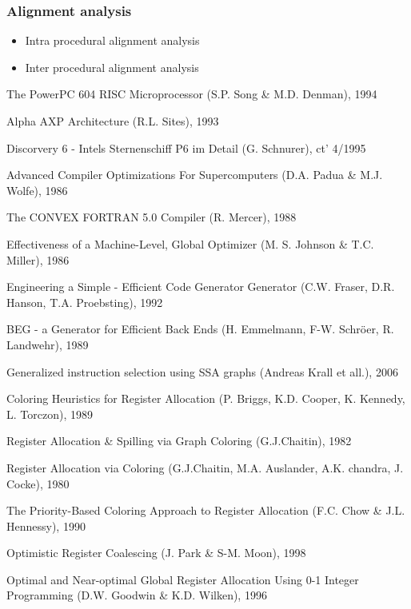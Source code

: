 \documentclass[a4paper,10pt]{article}
\begin{document}
\subsubsection{Alignment analysis}
\begin{itemize}
 \item Intra procedural alignment analysis
 \item Inter procedural alignment analysis
\end{itemize}

\begin{thebibliography}{9}
\footnotesize
{}
The PowerPC 604 RISC Microprocessor (S.P. Song \& M.D. Denman), 1994

Alpha AXP Architecture (R.L. Sites), 1993

Discorvery 6 - Intels Sternenschiff P6 im Detail (G. Schnurer), ct' 4/1995

Advanced Compiler Optimizations For Supercomputers (D.A. Padua \& M.J. Wolfe), 1986

The CONVEX FORTRAN 5.0 Compiler (R. Mercer), 1988

Effectiveness of a Machine-Level, Global Optimizer (M. S. Johnson \& T.C. Miller), 1986

Engineering a Simple - Efficient Code Generator Generator (C.W. Fraser, D.R. Hanson, T.A. Proebsting), 1992

BEG - a Generator for Efficient Back Ends (H. Emmelmann, F-W. Schr\"oer, R. Landwehr), 1989

Generalized instruction selection using SSA graphs (Andreas Krall et all.), 2006

Coloring Heuristics for Register Allocation (P. Briggs, K.D. Cooper, K. Kennedy, L. Torczon), 1989

Register Allocation \& Spilling via Graph Coloring (G.J.Chaitin), 1982

Register Allocation via Coloring (G.J.Chaitin, M.A. Auslander, A.K. chandra, J. Cocke), 1980

The Priority-Based Coloring Approach to Register Allocation (F.C. Chow \& J.L. Hennessy), 1990

Optimistic Register Coalescing (J. Park \& S-M. Moon), 1998

Optimal and Near-optimal Global Register Allocation Using 0-1 Integer Programming (D.W. Goodwin \& K.D. Wilken), 1996


\end{thebibliography}
\end{document}
